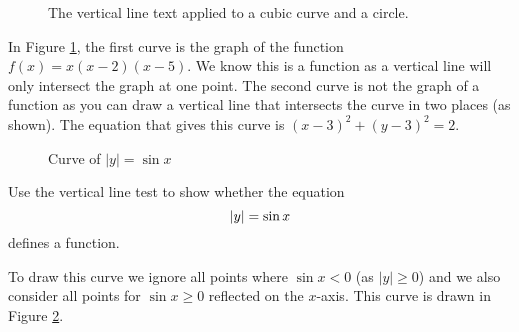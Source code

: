 \begin{figure}
    \centering
    \caption{The vertical line text applied to a cubic curve and a circle.}
    \label{fig:vertical_line_example}
\end{figure}

In Figure \ref{fig:vertical_line_example}, the first curve is the graph of the function $f(x)=x(x-2)(x-5)$. We know this is a function as a vertical line will only intersect the graph at one point. The second curve is not the graph of a function as you can draw a vertical line that intersects the curve in two places (as shown). The equation that gives this curve is $(x-3)^2+(y-3)^2=2$.

\begin{figure}
    \centering
    \caption{Curve of $|y|=\sin{x}$}
    \label{fig:modulus_sin_graph}
\end{figure}

\begin{example}
    Use the vertical line test to show whether the equation \[ \lvert y\rvert = \sin{x} \] defines a function.
    
    To draw this curve we ignore all points where $\sin{x}<0$ (as $|y|\geq0$) and we also consider all points for $\sin{x}\geq 0$ reflected on the $x$-axis. This curve is drawn in Figure \ref{fig:modulus_sin_graph}.
\end{example}

